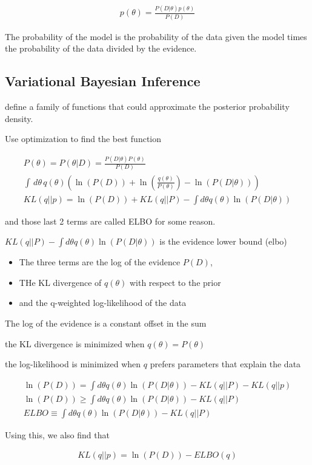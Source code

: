 \documentclass[fleqn]{report}
\newcommand{\equations} [1] {
\begin{gather*}
#1
\end{gather*}
}
\begin{document}
\equations{
    p(\theta) = 
    \frac{P(D | \theta) p(\theta)}{P(D)}
}
The probability of the model is the probability of the data given the model 
times the probability of the data divided by the evidence. 

\subsection{Variational Bayesian Inference}
define a family of functions that could approximate the posterior 
probability density. 

Use optimization to find the best function 

\equations{
    P(\theta) = 
    P(\theta | D )
    =
    \frac{P(D | \theta) P(\theta)}{P(D)}
    \\
    \int \, d\theta \, 
    q(\theta)
    \left(
        \ln(P(D))
        +
        \ln(\frac{q(\theta)}{P(\theta)})
        -
        \ln(P(D | \theta))
    \right)
    \\
    KL(q || p) 
    =
    \ln(P(D))
    +
    KL(q || P)
    -
    \int d \theta q(\theta) \ln(P(D | \theta))
}
and those last 2 terms are called ELBO for some reason. 

$
    KL(q || P)
    -
    \int d \theta q(\theta) \ln(P(D | \theta))
$
is the evidence lower bound (elbo)

\begin{itemize}
\item
The three terms are the log of the evidence $P(D)$, 
\item
THe KL divergence of $q(\theta)$ with respect to the prior 
\item
and the q-weighted log-likelihood of the data
\end{itemize}

The log of the evidence is a constant offset in the sum 

the KL divergence is minimized when $q(\theta) = P(\theta)$

the log-likelihood is minimized when $q$ prefers 
parameters that explain the data 

\equations{
    \ln(P(D))
    =
    \int d \theta q(\theta) \ln(P(D | \theta))
    -
    KL(q || P) 
    -
    KL(q || p)
    \\
    \ln(P(D))
    \geq 
    \int d \theta q(\theta) \ln(P(D | \theta))
    -
    KL(q || P) 
    \\
    ELBO
    \equiv  
    \int d \theta q(\theta) \ln(P(D | \theta))
    -
    KL(q || P) 
}

Using this, we also find that 
\equations{
    KL(q || p) 
    =
    \ln(P(D))
    -
    ELBO(q)
}
\end{document}
